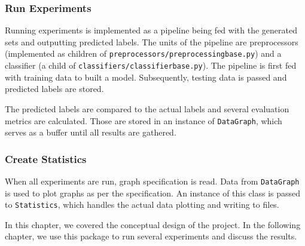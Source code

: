 \subsubsection{Run Experiments}

Running experiments is implemented as a pipeline being fed with the generated sets and outputting predicted labels.
The units of the pipeline are preprocessors (implemented as children of \texttt{preprocessors/preprocessingbase.py}) and a classifier (a child of \texttt{classifiers/classifierbase.py}).
The pipeline is first fed with training data to built a model.
Subsequently, testing data is passed and predicted labels are stored.

The predicted labels are compared to the actual labels and several evaluation metrics are calculated.
Those are stored in an instance of \texttt{DataGraph}, which serves as a buffer until all results are gathered.

\subsubsection{Create Statistics}

When all experiments are run, graph specification is read.
Data from \texttt{DataGraph} is used to plot graphs as per the specification.
An instance of this class is passed to \texttt{Statistics},
which handles the actual data plotting and writing to files.

In this chapter, we covered the conceptual design of the project.
In the following chapter, we use this package to run several experiments and discuss the results.
